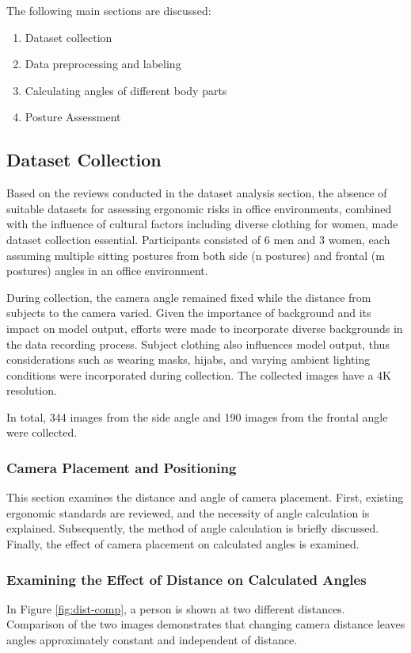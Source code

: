 \documentclass[lettersize,journal]{IEEEtran}
\begin{document}
The following main sections are discussed:
\begin{enumerate}
    \item Dataset collection
    \item Data preprocessing and labeling
    \item Calculating angles of different body parts
    \item Posture Assessment
\end{enumerate}

\subsection{Dataset Collection}
Based on the reviews conducted in the dataset analysis section, the absence of suitable datasets for assessing ergonomic risks in office environments, combined with the influence of cultural factors including diverse clothing for women, made dataset collection essential. Participants consisted of 6 men and 3 women, each assuming multiple sitting postures from both side (n postures) and frontal (m postures) angles in an office environment.

During collection, the camera angle remained fixed while the distance from subjects to the camera varied. Given the importance of background and its impact on model output, efforts were made to incorporate diverse backgrounds in the data recording process. Subject clothing also influences model output, thus considerations such as wearing masks, hijabs, and varying ambient lighting conditions were incorporated during collection. The collected images have a 4K resolution.

In total, 344 images from the side angle and 190 images from the frontal angle were collected.

\subsubsection{Camera Placement and Positioning}
This section examines the distance and angle of camera placement. First, existing ergonomic standards are reviewed, and the necessity of angle calculation is explained. Subsequently, the method of angle calculation is briefly discussed. Finally, the effect of camera placement on calculated angles is examined.

\subsubsection{Examining the Effect of Distance on Calculated Angles}
In Figure \ref{fig:dist-comp}, a person is shown at two different distances. Comparison of the two images demonstrates that changing camera distance leaves angles approximately constant and independent of distance.
\end{document}
